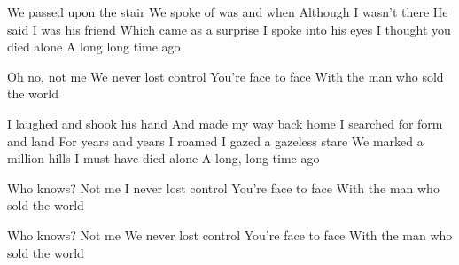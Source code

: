\begin{guitar}
We passed upon the stair
We spoke of was and when
Although I wasn't there
He said I was his friend
Which came as a surprise
I spoke into his eyes
I thought you died alone
A long long time ago

Oh no, not me
We never lost control
You're face to face
With the man who sold the world

I laughed and shook his hand
And made my way back home
I searched for form and land
For years and years I roamed
I gazed a gazeless stare
We marked a million hills
I must have died alone
A long, long time ago

Who knows?
Not me
I never lost control
You're face to face
With the man who sold the world

Who knows?
Not me
We never lost control
You're face to face
With the man who sold the world 
\end{guitar}